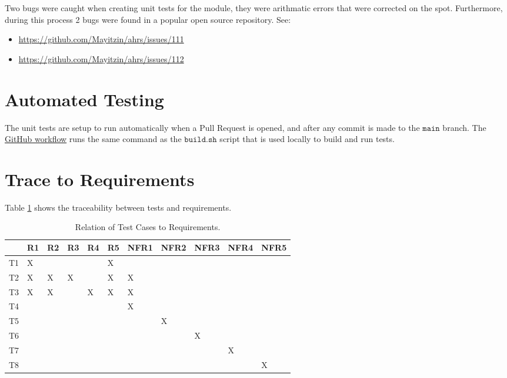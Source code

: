 \documentclass[12pt, titlepage]{article}
\begin{document}
Two bugs were caught when creating unit tests for the \progname{} module, they were arithmatic
errors that were corrected on the spot. Furthermore, during this process 2 bugs were found in a
popular open source repository. See:
\begin{itemize}
  \item \url{https://github.com/Mayitzin/ahrs/issues/111}
  \item \url{https://github.com/Mayitzin/ahrs/issues/112}
\end{itemize}

\section{Automated Testing}

The unit tests are setup to run automatically when a Pull Request is opened, and after any commit is
made to the $\mathtt{main}$ branch. The
\href{https://github.com/adrian-soch/attitude_check/blob/main/.github/workflows/ci.yaml}{GitHub
workflow} runs the same command as the $\mathtt{build.sh}$ script that is used locally to build and
run tests.

\section{Trace to Requirements}

Table \ref{tab:req_trace} shows the traceability between tests and requirements.
\begin{table}[H]
  \centering
  \caption{Relation of Test Cases to Requirements.}
  \vspace{2mm}
  \label{tab:req_trace}
  \begin{tabular}{|l|l|l|l|l|l|l|l|l|l|l|}
  \hline
     & R1 & R2 & R3 & R4 & R5 & NFR1 & NFR2 & NFR3 & NFR4 & NFR5 \\ \hline
  T1 & X  &    &    &    & X  &      &      &      &      &      \\ \hline
  T2 & X  & X  & X  &    & X  & X    &      &      &      &      \\ \hline
  T3 & X  & X  &    & X  & X  & X    &      &      &      &      \\ \hline
  T4 &    &    &    &    &    & X    &      &      &      &      \\ \hline
  T5 &    &    &    &    &    &      & X    &      &      &      \\ \hline
  T6 &    &    &    &    &    &      &      & X    &      &      \\ \hline
  T7 &    &    &    &    &    &      &      &      & X    &      \\ \hline
  T8 &    &    &    &    &    &      &      &      &      & X    \\ \hline
  \end{tabular}
\end{table}
\end{document}
